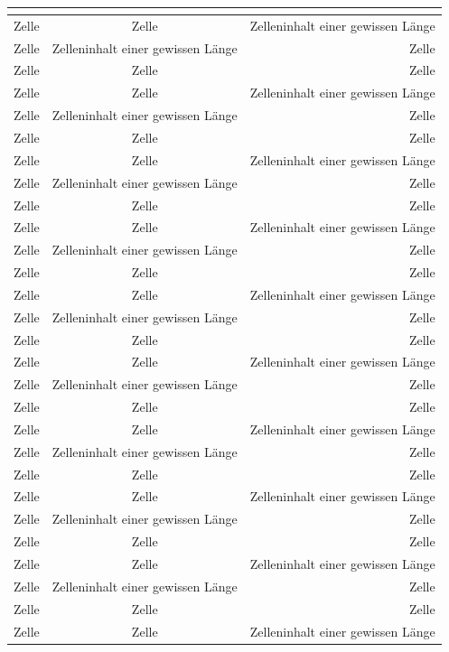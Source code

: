 \documentclass[ngerman]{scrartcl}
\begin{document}
	\begin{longtabu}[l]{@{}lcr@{}}
		\toprule
		\label{tab:tab}\\
		\midrule
		Zelle & Zelle & Zelleninhalt einer gewissen Länge\\
		Zelle & Zelleninhalt einer gewissen Länge & Zelle\\
		Zelle & Zelle & Zelle\\
		Zelle & Zelle & Zelleninhalt einer gewissen Länge\\
		Zelle & Zelleninhalt einer gewissen Länge & Zelle\\
		Zelle & Zelle & Zelle\\
		Zelle & Zelle & Zelleninhalt einer gewissen Länge\\
		Zelle & Zelleninhalt einer gewissen Länge & Zelle\\
		Zelle & Zelle & Zelle\\
		Zelle & Zelle & Zelleninhalt einer gewissen Länge\\
		Zelle & Zelleninhalt einer gewissen Länge & Zelle\\
		Zelle & Zelle & Zelle\\
		Zelle & Zelle & Zelleninhalt einer gewissen Länge\\
		Zelle & Zelleninhalt einer gewissen Länge & Zelle\\
		Zelle & Zelle & Zelle\\
		Zelle & Zelle & Zelleninhalt einer gewissen Länge\\
		Zelle & Zelleninhalt einer gewissen Länge & Zelle\\
		Zelle & Zelle & Zelle\\
		Zelle & Zelle & Zelleninhalt einer gewissen Länge\\
		Zelle & Zelleninhalt einer gewissen Länge & Zelle\\
		Zelle & Zelle & Zelle\\
		Zelle & Zelle & Zelleninhalt einer gewissen Länge\\
		Zelle & Zelleninhalt einer gewissen Länge & Zelle\\
		Zelle & Zelle & Zelle\\
		Zelle & Zelle & Zelleninhalt einer gewissen Länge\\
		Zelle & Zelleninhalt einer gewissen Länge & Zelle\\
		Zelle & Zelle & Zelle\\
		Zelle & Zelle & Zelleninhalt einer gewissen Länge\\

\end{longtabu}
\end{document}
